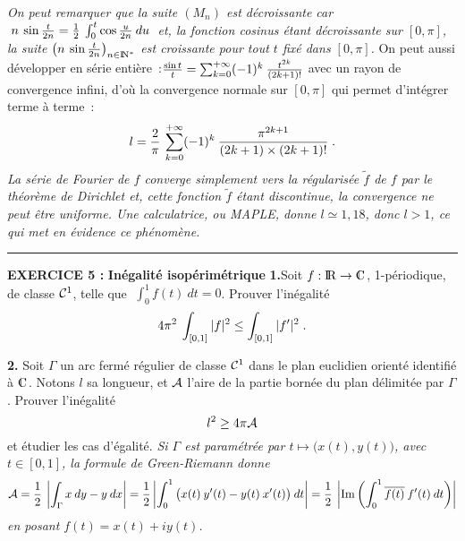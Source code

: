\documentclass{article}
\begin{document}
\msk\sect
{\it On peut remarquer que la suite $(M_n)$ est d\'ecroissante car $\;n\>\sin{t\over2n}={1\over2}\>\int_0^t\cos{u\over2n}\>du\;$ et, la fonction cosinus \'etant d\'ecroissante sur $[0,\pi]$, la suite $\left( n\>\sin{t\over2n}\right)_{n\in{\rm I\kern-0.5mm N}^*}$ est croissante pour tout $t$ fix\'e dans $[0,\pi]$.}
\msk\sect
On peut aussi d\'evelopper en s\'erie enti\`ere~:\quad ${\sin t\over t}=\sum_{k=0}^{+\infty}(-1)^k\>{t^{2k}\over(2k+1)!}$ avec un rayon de convergence infini, d'o\`u la convergence normale sur $[0,\pi]$ qui permet d'int\'egrer terme \`a terme~:\vvvv
$$l={2\over\pi}\>\sum_{k=0}^{+\infty}(-1)^k\>{\pi^{2k+1}\over(2k+1)\times(2k+1)!}\;.$$
\sect
{\it La s\'erie de Fourier de $f$ converge simplement vers la r\'egularis\'ee $\tilde{f}$ de $f$ par le th\'eor\`eme de Dirichlet et, cette fonction $\tilde{f}$ \'etant discontinue, la convergence ne peut \^etre uniforme. Une calculatrice, ou MAPLE, donne $l\simeq 1,18$, donc $l>1$, ce qui met en \'evidence ce ph\'enom\`ene.}

\bsk\hrule\bsk

{\bf EXERCICE 5 :}\msk
{\bf In\'egalit\'e isop\'erim\'etrique}\msk
{\bf 1.}Soit $f:\rmat\vers\cmat$, 1-p\'eriodique, de classe ${\cal C}^1$, telle que $\;\int_0^1f(t)\>dt=0$.\ssk\sect
Prouver l'in\'egalit\'e\vv
$$4\pi^2\>\int_{[0,1]}|f|^2\leq\int_{[0,1]}|f'|^2\;.$$
\par
{\bf 2.} Soit $\Gamma$ un arc ferm\'e r\'egulier de classe ${\cal C}^1$ dans le plan euclidien orient\'e identifi\'e \`a $\cmat$. Notons $l$ sa longueur, et ${\cal A}$ l'aire de la partie born\'ee du plan d\'elimit\'ee par $\Gamma$.\ssk\sect
Prouver l'in\'egalit\'e\vv
$$l^2\geq4\pi{\cal A}$$
et \'etudier les cas d'\'egalit\'e.
\msk
\sect
{\it Si $\Gamma$ est param\'etr\'ee par $t\mapsto \big(x(t),y(t)\big)$, avec $t\in[0,1]$, la formule de Green-Riemann donne\vv
$${\cal A}={1\over2}\>\left|\int_{\Gamma}x\>dy-y\>dx\right|={1\over2}\left|\int_0^1\big(x(t)\>y'(t)-y(t)\>x'(t)\big)\>dt\right|={1\over 2}\>\left|\mathop{\rm Im}\nolimits\left(\int_0^1\overline{f(t)}\>f'(t)\>dt\right)\right|$$
en posant $f(t)=x(t)+iy(t)$.}

\msk
\cl{- - - - - - - - - - - - - - - - - - - - - - - - - - - - - - - }
\msk
\end{document}
